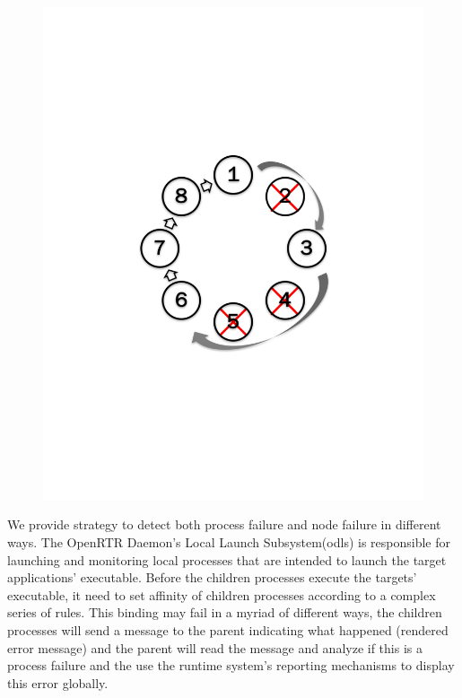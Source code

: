 \documentclass[sigconf]{acmart}
\begin{document}
\begin{figure}
\begin{minipage}{.23\textwidth}
  \includegraphics[trim=3cm 8.0cm 3cm 8cm,width=\linewidth]{reconnet_cross.pdf}
  \label{fig:Reconnect Ring}
\end{minipage}
\end{figure}
We provide strategy to detect both process failure and node failure in different ways. The OpenRTR Daemon's Local Launch Subsystem(odls) is responsible for launching and monitoring local processes that are intended to launch the target applications' executable. Before the children processes execute the targets' executable, it need to set affinity of children processes according to a complex series of rules. This binding may fail in a myriad of different ways, the children processes will send a message to the parent indicating what happened (rendered error message) and the parent will read the message and analyze if this is a process failure and the use the runtime system's reporting mechanisms to display this error globally. 
\end{document}
